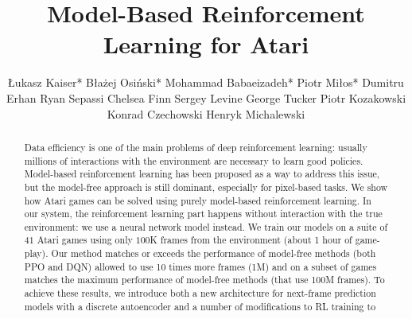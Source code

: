 \documentclass{article} %
\title{Model-Based Reinforcement Learning for Atari}
\author{
 \L{}ukasz Kaiser* \And Błażej Osiński* \And Mohammad Babaeizadeh* \And Piotr Mi\l{}os* \And
 Dumitru Erhan \And Ryan Sepassi \And Chelsea Finn \And Sergey Levine \And  George Tucker \And
 Piotr Kozakowski \And Konrad Czechowski \And Henryk Michalewski
}
\begin{document}
\maketitle

\begin{abstract}
Data efficiency is one of the main problems of deep reinforcement learning:
usually millions of interactions with the environment are necessary to learn
good policies. Model-based reinforcement learning has been proposed as a way to
address this issue, but the model-free approach is still dominant,
especially for pixel-based tasks.
We show how Atari games can be solved using purely model-based reinforcement learning.
In our system, the reinforcement learning part happens without interaction with the true environment:
we use a neural network model instead.
We train our models on a suite of $41$ Atari games using only
$100$K frames from the environment (about 1 hour of game-play).
Our method matches or exceeds the performance of model-free methods (both PPO and DQN)
allowed to use 10 times more frames (1M) and on a subset of games matches the maximum
performance of model-free methods (that use 100M frames).
To achieve these results, we introduce both a new architecture for next-frame prediction
models with a discrete autoencoder and a number of modifications to RL training to

\end{abstract}
\end{document}

